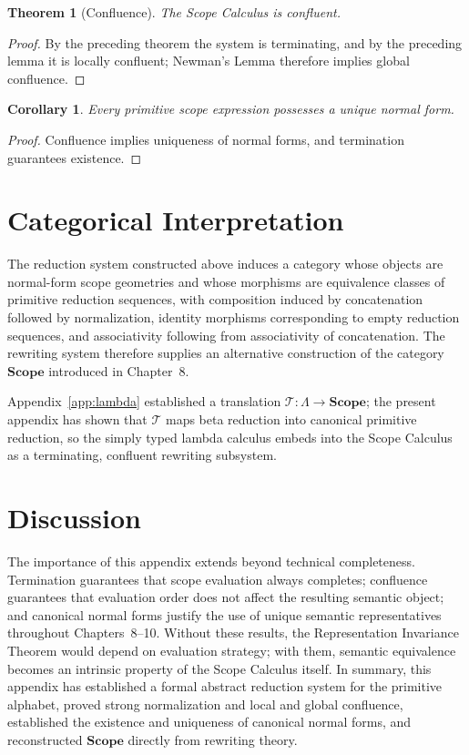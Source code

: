 \documentclass[11pt,twoside,openright]{book}
\numberwithin{equation}{chapter}
\theoremstyle{definition}
\theoremstyle{plain}
\newtheorem{theorem}[definition]{Theorem}
\newtheorem{corollary}[definition]{Corollary}
\theoremstyle{remark}
\theoremstyle{definition}
\newcommand{\CatScope}{\mathbf{Scope}}
\begin{document}
\begin{theorem}[Confluence]
The Scope Calculus is confluent.
\end{theorem}

\begin{proof}
By the preceding theorem the system is terminating, and by the preceding
lemma it is locally confluent; Newman's Lemma therefore implies global
confluence.
\end{proof}

\begin{corollary}
Every primitive scope expression possesses a unique normal form.
\end{corollary}

\begin{proof}
Confluence implies uniqueness of normal forms, and termination guarantees
existence.
\end{proof}

\section{Categorical Interpretation}

The reduction system constructed above induces a category whose objects
are normal-form scope geometries and whose morphisms are equivalence
classes of primitive reduction sequences, with composition induced by
concatenation followed by normalization, identity morphisms corresponding
to empty reduction sequences, and associativity following from
associativity of concatenation. The rewriting system therefore supplies
an alternative construction of the category $\CatScope$ introduced in
Chapter~8.

Appendix~\ref{app:lambda} established a translation
$\mathcal{T}:\Lambda\to\CatScope$; the present appendix has shown that
$\mathcal{T}$ maps beta reduction into canonical primitive reduction, so
the simply typed lambda calculus embeds into the Scope Calculus as a
terminating, confluent rewriting subsystem.

\section{Discussion}

The importance of this appendix extends beyond technical completeness.
Termination guarantees that scope evaluation always completes; confluence
guarantees that evaluation order does not affect the resulting semantic
object; and canonical normal forms justify the use of unique semantic
representatives throughout Chapters~8--10. Without these results, the
Representation Invariance Theorem would depend on evaluation strategy;
with them, semantic equivalence becomes an intrinsic property of the
Scope Calculus itself. In summary, this appendix has established a formal
abstract reduction system for the primitive alphabet, proved strong
normalization and local and global confluence, established the existence
and uniqueness of canonical normal forms, and reconstructed $\CatScope$
directly from rewriting theory.
\end{document}
